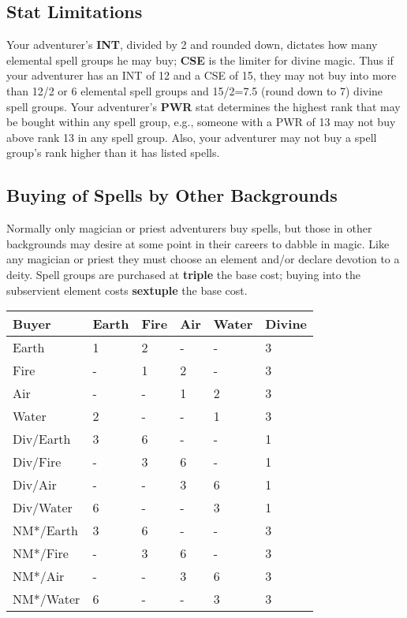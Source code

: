\begin{multicols*}{2}
\subsection{Stat Limitations}
Your adventurer’s \textbf{INT}, divided by 2 and rounded down, dictates how many elemental spell groups he may buy; \textbf{CSE} is the limiter for divine magic. Thus if your adventurer has an INT of 12 and a CSE of 15, they may not buy into more than 12/2 or 6 elemental spell groups and 15/2=7.5 (round down to 7) divine spell groups.
Your adventurer’s \textbf{PWR} stat determines the highest rank that may be bought within any spell group, e.g., someone with a PWR of 13 may not buy above rank 13 in any spell group. Also, your adventurer may not buy a spell group’s rank higher than it has listed spells.
\subsection{Buying of Spells by Other Backgrounds}
Normally only magician or priest adventurers buy spells, but those in other backgrounds may desire at some point in their careers to dabble in magic. Like any magician or priest they must choose an element and/or declare devotion to a deity. Spell groups are purchased at \textbf{triple} the base cost; buying into the subservient element costs \textbf{sextuple} the base cost.

\begin{tcolorbox}[breakable,boxrule=0pt]
\begin{tabular}{l l l l l l}
\textbf{Buyer} & \textbf{Earth}  & \textbf{Fire} & \textbf{Air} & \textbf{Water}  & \textbf{Divine}\\
\midrule
Earth & 1 & 2 & - & - & 3\\
Fire & - & 1 & 2 & - & 3\\
Air & - & - & 1 & 2 & 3\\
Water & 2 & - & - & 1 & 3\\
Div/Earth & 3 & 6 & - & - & 1\\
Div/Fire & - & 3 & 6 & - & 1\\
Div/Air & - & - & 3 & 6 & 1\\
Div/Water & 6 & - & - & 3 & 1\\
NM*/Earth & 3 & 6 & - & - & 3\\
NM*/Fire & - & 3 & 6 & - & 3\\
NM*/Air & - & - & 3 & 6 & 3\\
NM*/Water & 6 & - & - & 3 & 3\\
\end{tabular}
\end{tcolorbox}


\end{multicols*}
